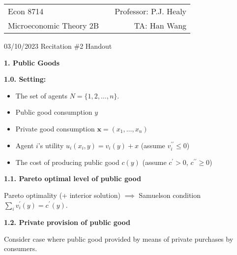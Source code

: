 \documentclass[11pt,leqno]{article}
\begin{document}
\vspace*{-20mm}

\begin{tabular*}{\textwidth}{@{\extracolsep{\fill}}lcr}
Econ 8714     & \hfill    &         Professor: P.J. Healy          \\
Microeconomic Theory 2B  &           &   TA: Han Wang    
\end{tabular*}

\bigskip
\begin{center}
{\Large 03/10/2023 Recitation \#2 Handout}
\end{center}

\bigskip


\textbf{1. Public Goods}

\textbf{1.0. Setting:}
\begin{itemize}
    \item The set of agents $N=\{1,2,\ldots,n\}$.
    \item Public good consumption $y$
    \item Private good consumption $\textbf{x}=(x_{1},\ldots,x_{n})$
    \item Agent $i$'s utility $u_{i}(x_{i},y)=v_{i}(y)+x$ (assume $v_{i}^{\prime\prime}\leq 0$)
    \item The cost of producing public good $c(y)$   (assume $c^{\prime}>0$, $c^{\prime\prime}\geq 0$)
\end{itemize}

\textbf{1.1. Pareto optimal level of public good}

Pareto optimality (+ interior solution) $\implies$ Samuelson condition $\sum_{i} v_{i}^{\prime}(y)=c^{\prime}(y)$.

\textbf{1.2. Private provision of public good}

Consider case where public good provided by means of private purchases by consumers. 
\end{document}
